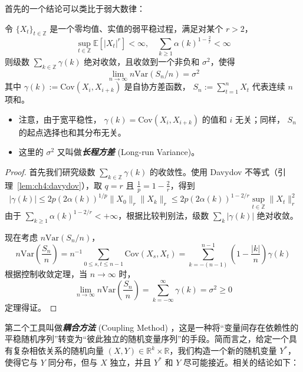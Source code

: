 首先的一个结论可以类比于弱大数律：

\begin{theorem}[长程方差的存在性]
\label{thm:ch4:long-run-variance}

令 $\{X_t\}_{t \in \mathbb{Z}}$ 是一个零均值、实值的弱平稳过程，满足对某个 $r > 2$，
\[\sup_{t\in \mathbb{Z}}\mathbb{E}[|X_t|^r ]< \infty ,\quad \sum_{k\geq 1}\alpha (k)^{1 - \frac{2}{r}}< \infty\]
则级数 $\sum_{k\in \mathbb{Z}}\gamma (k)$ 绝对收敛，且收敛到一个非负和 $\sigma^2$，使得
\[\lim_{n\to \infty}n\mathrm{Var}(S_n / n) = \sigma^2\]
其中 $\gamma (k) := \mathrm{Cov}(X_i, X_{i+k})$ 是自协方差函数， $S_n:=\sum_{t=1}^nX_t$ 代表连续 $n$ 项和。

\end{theorem}

\begin{remark}

\begin{itemize}
\tightlist
\item
  注意，由于宽平稳性， $\gamma(k)=\mathrm{Cov}(X_i,X_{i+k})$ 的值和 $i$ 无关；同样， $S_n$ 的起点选择也和其分布无关。
\item
  这里的 $\sigma^2$ 又叫做\textbf{\emph{长程方差}} (Long-run Variance)。
\end{itemize}
\end{remark}

\begin{proof}

首先我们研究级数 $\sum_{k \in \mathbb{Z}} \gamma(k)$ 的收敛性。使用 Davydov 不等式（引理~\ref{lem:ch4:davydov}），取 $q = r$ 且 $\frac{1}{p} = 1 - \frac{2}{r}$，得到
\[|\gamma (k)| \leq 2p (2\alpha(k))^{1/p} \|X_0\|_r \|X_k\|_r \leq 2p (2\alpha(k))^{1 - 2/r} \sup_{t\in\mathbb{Z}}\|X_t\|_r^2\]
由于 $\sum_{k \geq 1} \alpha (k)^{1 - 2 / r} < +\infty$，根据比较判别法，级数 $\sum_k |\gamma(k)|$ 绝对收敛。

现在考虑 $n \mathrm{Var} (S_n / n)$，
\[n \mathrm{Var}\! \left(\frac{S_n}{n}\right) = n^{-1} \sum_{0 \leq s, t \leq n - 1} \mathrm{Cov}(X_s, X_t) = \sum_{k = -(n - 1)}^{n - 1} \left(1 - \frac{|k|}{n}\right) \gamma (k)\]
根据控制收敛定理，当 $n \to \infty$ 时，
\[\lim_{n \to \infty} n \mathrm{Var}\! \left(\frac{S_n}{n}\right) = \sum_{k=-\infty}^\infty \gamma(k) = \sigma^2 \geq 0\]
定理得证。

\end{proof}

第二个工具叫做\textbf{\emph{耦合方法}} (Coupling Method) ，这是一种将``变量间存在依赖性的平稳随机序列''转变为``彼此独立的随机变量序列''的手段。简而言之，给定一个具有复杂相依关系的随机向量 $(X,Y)\in\mathbb R^k\times\mathbb R$，我们构造一个新的随机变量 $Y^*$，使得它与 $Y$ 同分布，但与 $X$ 独立，并且 $Y^*$ 和 $Y$ 尽可能接近。相关的结论如下：

